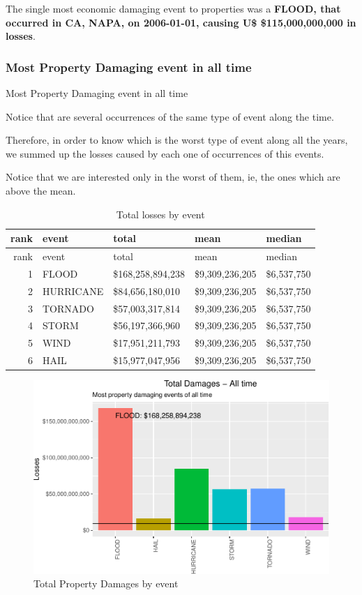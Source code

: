\documentclass[]{article}
\begin{document}
The single most economic damaging event to properties was a
\textbf{FLOOD, that occurred in CA, NAPA, on 2006-01-01, causing U\$
\$115,000,000,000 in losses}.

\subsubsection{Most Property Damaging event in all
time}\label{most-property-damaging-event-in-all-time}

Most Property Damaging event in all time

Notice that are several occurrences of the same type of event along the
time.

Therefore, in order to know which is the worst type of event along all
the years, we summed up the losses caused by each one of occurrences of
this events.

Notice that we are interested only in the worst of them, ie, the ones
which are above the mean.

\begin{longtable}[]{@{}rllll@{}}
\caption{Total losses by event}\tabularnewline
\toprule
rank & event & total & mean & median\tabularnewline
\midrule
\endfirsthead
\toprule
rank & event & total & mean & median\tabularnewline
\midrule
\endhead
1 & FLOOD & \$168,258,894,238 & \$9,309,236,205 &
\$6,537,750\tabularnewline
2 & HURRICANE & \$84,656,180,010 & \$9,309,236,205 &
\$6,537,750\tabularnewline
3 & TORNADO & \$57,003,317,814 & \$9,309,236,205 &
\$6,537,750\tabularnewline
4 & STORM & \$56,197,366,960 & \$9,309,236,205 &
\$6,537,750\tabularnewline
5 & WIND & \$17,951,211,793 & \$9,309,236,205 &
\$6,537,750\tabularnewline
6 & HAIL & \$15,977,047,956 & \$9,309,236,205 &
\$6,537,750\tabularnewline
\bottomrule
\end{longtable}

\begin{figure}[htbp]
\centering
\includegraphics{readme_files/figure-latex/prop-all-plot-1.pdf}
\caption{Total Property Damages by event}
\end{figure}
\end{document}
